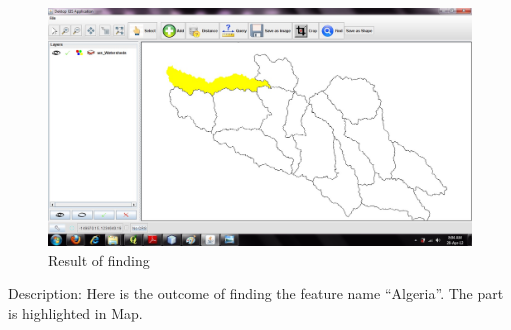 \newpage
\begin{figure}[h]
\begin{center}
  \includegraphics[scale=0.43] {17.jpg}
  \caption[Screenshot - Result of Finding]{Result of finding}
\end{center}
\end{figure}
Description: Here is the outcome of finding the feature name “Algeria”. The part is highlighted in Map.
\newpage

